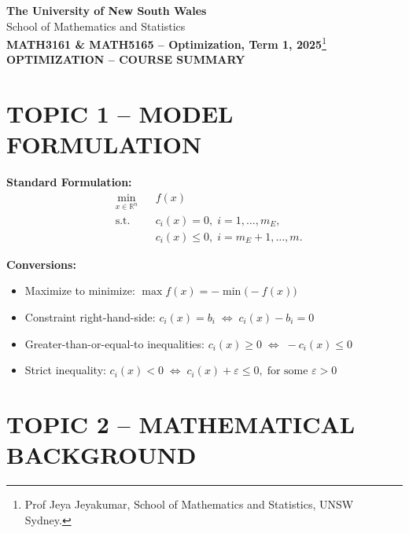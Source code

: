 \documentclass[12pt]{article}
\begin{document}
\begin{center}
\textbf{The University of New South Wales}\\
School of Mathematics and Statistics\\[1.2em]
\textbf{MATH3161 \& MATH5165 -- Optimization, Term 1, 2025}\footnote{Prof Jeya Jeyakumar, School of Mathematics and Statistics, UNSW Sydney.}\\[1.2em]
\textbf{OPTIMIZATION -- COURSE SUMMARY}
\end{center}

\bigskip

\section*{TOPIC 1 -- MODEL FORMULATION}

\textbf{Standard Formulation:}
\begin{equation*}
\begin{aligned}
&\min_{x \in \mathbb{R}^n} && f(x) \\
&\text{s.t.}\; && c_i(x)=0,\; i = 1,\ldots,m_E,\\
& && c_i(x)\le 0,\; i = m_E+1,\ldots,m.
\end{aligned}
\end{equation*}

\textbf{Conversions:}
\begin{itemize}
  \item Maximize to minimize: $\displaystyle \max f(x) = -\min\bigl(-f(x)\bigr)$
  \item Constraint right-hand-side: $c_i(x)=b_i \;\Leftrightarrow\; c_i(x)-b_i = 0$
  \item Greater-than-or-equal-to inequalities: $c_i(x)\ge 0 \;\Leftrightarrow\; -c_i(x)\le 0$
  \item Strict inequality: $c_i(x) < 0 \;\Leftrightarrow\; c_i(x)+\varepsilon \le 0,\; \text{for some } \varepsilon>0$
\end{itemize}

\bigskip
\section*{TOPIC 2 -- MATHEMATICAL BACKGROUND}
\end{document}
